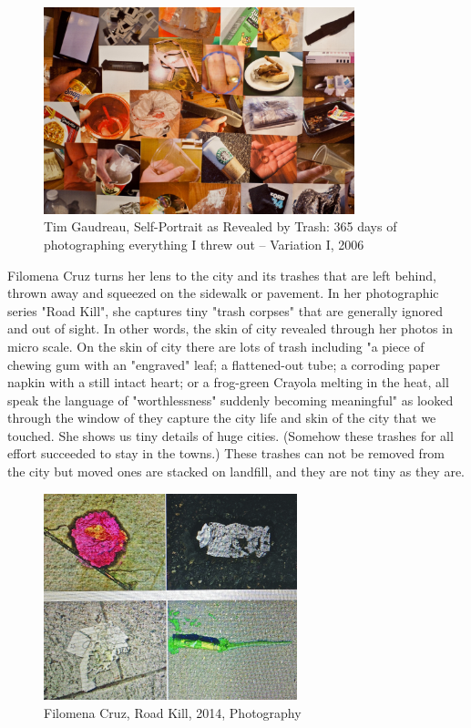 \begin{figure}[h!]
  \centering
  \includegraphics[height=6cm]{graphics/TimGaudreau_SelfPotraitRevealedByTrash.jpg}
  \caption{Tim Gaudreau, Self-Portrait as Revealed by Trash: 365 days of photographing everything I threw out – Variation I, 2006}
  \label{fig:TimGaudreau_SelfPotraitRevealedByTrash}
\end{figure}

Filomena Cruz turns her lens to the city and its trashes that are left behind, thrown away and squeezed on the sidewalk or pavement. In her photographic series "Road Kill", she captures tiny "trash corpses" that are generally ignored and out of sight. In other words, the skin of city revealed through her photos in micro scale. On the skin of city there are lots of trash including "a piece of chewing gum with an "engraved" leaf; a flattened-out tube; a corroding paper napkin with a still intact heart; or a frog-green Crayola melting in the heat, all speak the language of "worthlessness" suddenly becoming meaningful" as looked through the window of they capture the city life and skin of the city that we touched. She shows us tiny details of huge cities. (Somehow these trashes for all effort succeeded to stay in the towns.) These trashes can not be removed from the city but moved ones are stacked on landfill, and they are not tiny as they are.

\begin{figure}[h!]
  \centering
  \includegraphics[height=6cm]{graphics/FilomenaCruz_RoadKill_ReVista.jpg}
  \caption{Filomena Cruz, Road Kill, 2014, Photography}
  \label{fig:FilomenaCruz_RoadKill_ReVista}
\end{figure}

